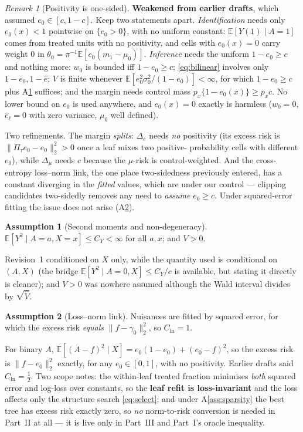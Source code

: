 \documentclass[11pt]{article}
\theoremstyle{plain}
\theoremstyle{definition}
\newtheorem{assumption}{Assumption}
\theoremstyle{remark}
\newtheorem{remark}{Remark}
\newcommand{\E}{\mathbb{E}}
\newcommand{\ez}{e_0}
\newcommand{\mz}{\mu_0}
\newcommand{\wz}{w_0}
\newcommand{\ehat}{\widehat{e}}
\newcommand{\Vhat}{\widehat{V}}
\newcommand{\Ltwo}[1]{\lVert #1 \rVert_{2}}
\begin{document}
\begin{remark}[Positivity is one-sided]\label{rem:positivity}
\textbf{Weakened from earlier drafts}, which assumed $\ez\in[c,1-c]$. Keep two
statements apart. \emph{Identification} needs only $\ez(x)<1$ pointwise on
$\{\ez>0\}$, with no uniform constant: $\E[Y(1)\mid A=1]$ comes from treated units
with no positivity, and cells with $\ez(x)=0$ carry weight $0$ in
$\theta_0=\pi^{-1}\E[\ez(m_1-\mz)]$. \emph{Inference} needs the uniform
$1-\ez\ge c$ and nothing more: $\wz$ is bounded iff $1-\ez\ge c$;
\eqref{eq:bilinear} involves only $1-\ez,1-\ehat$; $V$ is finite whenever
$\E[\ez^2\sigma_0^2/(1-\ez)]<\infty$, for which $1-\ez\ge c$ plus
A\ref{ass:moments} suffices; and the margin needs control mass
$p_x\{1-\ez(x)\}\ge p_xc$. No lower bound on $\ez$ is used anywhere, and
$\ez(x)=0$ exactly is harmless ($\wz=0$, $\ehat_\ell=0$ with zero variance, $\mz$
well defined).

Two refinements. The margin \emph{splits}: $\Delta_e$ needs \emph{no} positivity
(its excess risk is $\Ltwo{\Pi_\tau\ez-\ez}^2>0$ once a leaf mixes two positive-
probability cells with different $\ez$), while $\Delta_\mu$ needs $c$ because the
$\mu$-risk is control-weighted. And the cross-entropy loss--norm link, the one
place two-sidedness previously entered, has a constant diverging in the
\emph{fitted} values, which are under our control --- clipping candidates
two-sidedly removes any need to \emph{assume} $\ez\ge c$. Under squared-error
fitting the issue does not arise (A\ref{ass:lossnorm}).
\end{remark}

\begin{assumption}[Second moments and non-degeneracy]\label{ass:moments}
$\E[Y^2\mid A=a,X=x]\le C_Y<\infty$ for all $a,x$; and $V>0$.
\end{assumption}

\noindent Revision~1 conditioned on $X$ only, while the quantity used is
conditional on $(A,X)$ (the bridge $\E[Y^2\mid A=0,X]\le C_Y/c$ is available, but
stating it directly is cleaner); and $V>0$ was nowhere assumed although the Wald
interval divides by $\sqrt{\Vhat}$.

\begin{assumption}[Loss--norm link]\label{ass:lossnorm}
Nuisances are fitted by squared error, for which the excess risk \emph{equals}
$\Ltwo{f-\gamma_0}^2$, so $C_{\mathrm{ln}}=1$.
\end{assumption}

\noindent For binary $A$, $\E[(A-f)^2\mid X]=\ez(1-\ez)+(\ez-f)^2$, so the excess
risk is $\Ltwo{f-\ez}^2$ exactly, for any $\ez\in[0,1]$, with no positivity.
Earlier drafts said $C_{\mathrm{ln}}=\tfrac12$. Two scope notes: the within-leaf
treated fraction minimises \emph{both} squared error and log-loss over constants,
so the \textbf{leaf refit is loss-invariant} and the loss affects only the
structure search \eqref{eq:select}; and under A\ref{ass:sparsity} the best tree
has excess risk exactly zero, so \emph{no} norm-to-risk conversion is needed in
Part~II at all --- it is live only in Part~III and Part~I's oracle inequality.
\end{document}
